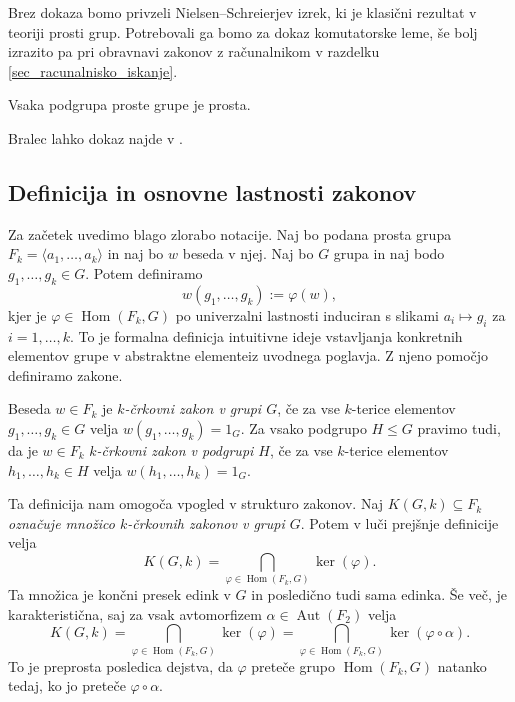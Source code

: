 Brez dokaza bomo privzeli Nielsen--Schreierjev izrek, ki je klasični rezultat v teoriji prosti grup. Potrebovali ga bomo za dokaz komutatorske leme,
še bolj izrazito pa pri obravnavi zakonov z računalnikom v razdelku \ref{sec_racunalnisko_iskanje}. 

\begin{izrek}
\label{izr_nielsen_schreier}
 Vsaka podgrupa proste grupe je prosta.
\end{izrek}

Bralec lahko dokaz najde v \cite[str.~5--8]{Lyndon_Schupp_2015}.

\subsection{Definicija in osnovne lastnosti zakonov}\label{sec_osnovne_lastnosti_zakonov}

Za začetek uvedimo blago zlorabo notacije. Naj bo podana prosta grupa $F_k = \langle a_1, \ldots, a_k \rangle$ in naj bo $w$ beseda v njej.
Naj bo $G$ grupa in naj bodo $g_1, \ldots, g_k \in G$. Potem definiramo \begin{equation*}
    w(g_1, \ldots, g_k) := \varphi(w),
\end{equation*}
kjer je $\varphi \in \operatorname{Hom}(F_k, G)$ po univerzalni lastnosti induciran s slikami $a_i \mapsto g_i$ za $i = 1, \ldots, k$.
To je formalna definicja intuitivne ideje \glqq vstavljanja konkretnih elementov grupe v abstraktne elemente\grqq iz uvodnega poglavja. Z njeno pomočjo definiramo zakone.

\begin{definicija}\label{def_zakon_formalna}
    Beseda $w \in F_k$ je \emph{$k$-črkovni zakon v grupi $G$}, če za vse $k$-terice elementov $g_1, \ldots, g_k \in G$ velja $w(g_1, \ldots, g_k) = 1_G$.
    Za vsako podgrupo $H \le G$ pravimo tudi, da je $w \in F_k$ \emph{$k$-črkovni zakon v podgrupi $H$}, če za vse $k$-terice elementov $h_1, \ldots, h_k \in H$ velja $w(h_1, \ldots, h_k) = 1_G$.
\end{definicija}

Ta definicija nam omogoča vpogled v strukturo zakonov. Naj \emph{$K(G, k) \subseteq F_k$ označuje množico $k$-črkovnih zakonov v grupi $G$}. Potem v luči prejšnje definicije velja
\begin{equation*}
K(G, k)  = \bigcap_{\varphi \in \operatorname{Hom}(F_k, G)} \ker(\varphi).   
\end{equation*}  
Ta množica je končni presek edink v $G$ in posledično tudi sama edinka. Še več, je karakteristična, saj za vsak avtomorfizem $\alpha \in \operatorname{Aut}(F_2)$ velja
\begin{equation*}
    K(G, k)  = \bigcap_{\varphi \in \operatorname{Hom}(F_k, G)} \ker(\varphi) = \bigcap_{\varphi \in \operatorname{Hom}(F_k, G)} \ker(\varphi \circ \alpha). 
\end{equation*}  
To je preprosta posledica dejstva, da $\varphi$ preteče grupo $\operatorname{Hom}(F_k, G)$ natanko tedaj, ko jo preteče $\varphi \circ \alpha$.     

